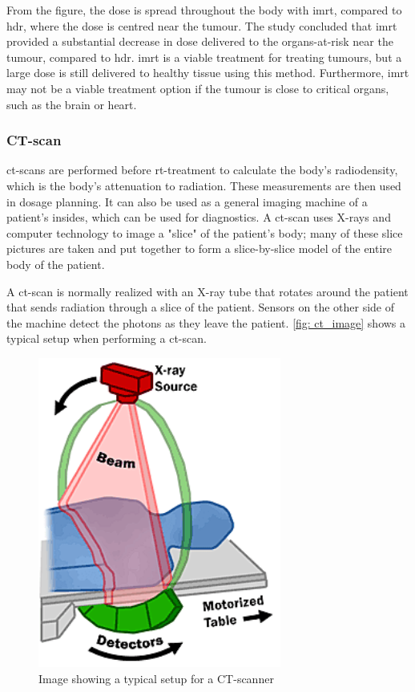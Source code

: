 \documentclass[main.tex]{subfiles}
\begin{document}
From the figure, the dose is spread throughout the body with \gls{imrt}, compared to \gls{hdr}, where the dose is centred near the tumour. The study concluded that \gls{imrt} provided a substantial decrease in dose delivered to the organs-at-risk near the tumour, compared to \gls{hdr}\cite{imrtVShdr}. \gls{imrt} is a viable treatment for treating tumours, but a large dose is still delivered to healthy tissue using this method. Furthermore, \gls{imrt} may not be a viable treatment option if the tumour is close to critical organs, such as the brain or heart.

\subsubsection{CT-scan}

\gls{ct}-scans are performed before \gls{rt}-treatment to calculate the body's radiodensity, which is the body's attenuation to radiation. These measurements are then used in dosage planning. It can also be used as a general imaging machine of a patient's insides, which can be used for diagnostics. A \gls{ct}-scan uses X-rays and computer technology to image a "slice" of the patient's body; many of these slice pictures are taken and put together to form a slice-by-slice model of the entire body of the patient.

A \gls{ct}-scan is normally realized with an X-ray tube that rotates around the patient that sends radiation through a slice of the patient. Sensors on the other side of the machine detect the photons as they leave the patient. \autoref{fig: ct_image} shows a typical setup when performing a \gls{ct}-scan.

 \begin{figure}[!htpb]
    \centering
    \includegraphics[width=8cm ]{images/CTXRAYScan.png}
    \caption{Image showing a typical setup for a CT-scanner\cite{CTimage}}
    \label{fig: ct_image}
\end{figure}
\FloatBarrier 
\end{document}
